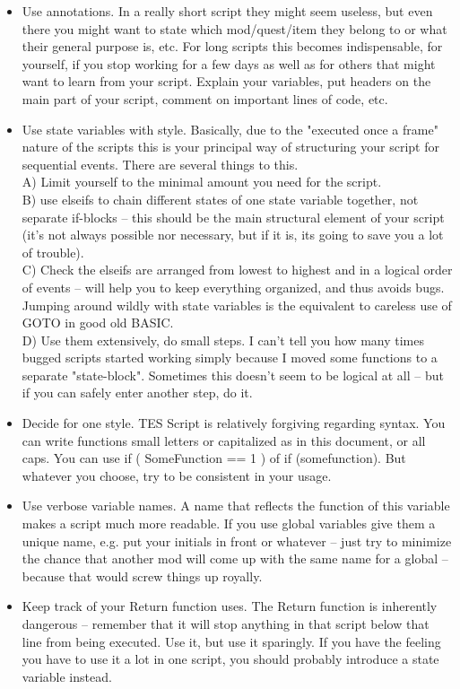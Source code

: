 \documentclass[
]{article}
\begin{document}
\begin{itemize}
\item
  Use annotations. In a really short script they might seem useless, but
  even there you might want to state which mod/quest/item they belong to
  or what their general purpose is, etc. For long scripts this becomes
  indispensable, for yourself, if you stop working for a few days as
  well as for others that might want to learn from your script. Explain
  your variables, put headers on the main part of your script, comment
  on important lines of code, etc.
\item
  Use state variables with style. Basically, due to the "executed once a
  frame" nature of the scripts this is your principal way of structuring
  your script for sequential events. There are several things to this.\\
  A) Limit yourself to the minimal amount you need for the script.\\
  B) use elseifs to chain different states of one state variable
  together, not separate if-blocks -- this should be the main structural
  element of your script (it's not always possible nor necessary, but if
  it is, its going to save you a lot of trouble).\\
  C) Check the elseifs are arranged from lowest to highest and in a
  logical order of events -- will help you to keep everything organized,
  and thus avoids bugs. Jumping around wildly with state variables is
  the equivalent to careless use of GOTO in good old BASIC.\\
  D) Use them extensively, do small steps. I can't tell you how many
  times bugged scripts started working simply because I moved some
  functions to a separate "state-block". Sometimes this doesn't seem to
  be logical at all -- but if you can safely enter another step, do it.
\item
  Decide for one style. TES Script is relatively forgiving regarding
  syntax. You can write functions small letters or capitalized as in
  this document, or all caps. You can use if ( SomeFunction == 1 ) of if
  (somefunction). But whatever you choose, try to be consistent in your
  usage.
\item
  Use verbose variable names. A name that reflects the function of this
  variable makes a script much more readable. If you use global
  variables give them a unique name, e.g. put your initials in front or
  whatever -- just try to minimize the chance that another mod will come
  up with the same name for a global -- because that would screw things
  up royally.
\item
  Keep track of your Return function uses. The Return function is
  inherently dangerous -- remember that it will stop anything in that
  script below that line from being executed. Use it, but use it
  sparingly. If you have the feeling you have to use it a lot in one
  script, you should probably introduce a state variable instead.
\end{itemize}
\end{document}
